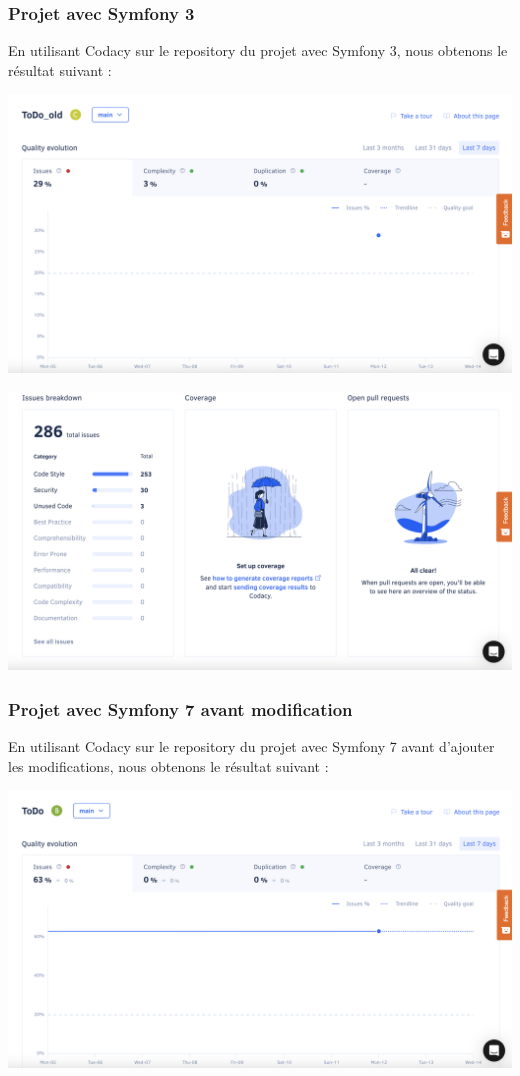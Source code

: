 \documentclass{article}
\theoremstyle{definition}
\theoremstyle{remark}
\begin{document}
\subsubsection{Projet avec Symfony 3}

En utilisant Codacy sur le repository du projet avec Symfony 3, nous obtenons le résultat suivant : 

\includegraphics[scale=0.4]{Capture_ToDo_old/ToDo_old_1.png}

\hspace*{2cm}

\includegraphics[scale=0.4]{Capture_ToDo_old/ToDo_old_2.png}

\subsubsection{Projet avec Symfony 7 avant modification}

En utilisant Codacy sur le repository du projet avec Symfony 7 avant d'ajouter les modifications, nous obtenons le résultat suivant : 

\includegraphics[scale=0.4]{Capture_new_avant_modif/ToDo_new_avant_modif_1.png}
\end{document}
